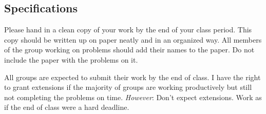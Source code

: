 \documentclass[11pt]{article}
\begin{document}
\subsection*{Specifications}

Please hand in a clean copy of your work by the end of your class period. This copy should be written up on paper neatly and in an organized way. All members of the group working on problems should add their names to the paper. Do not include the paper with the problems on it. 

All groups are expected to submit their work by the end of class. I have the right to grant extensions if the majority of groups are working productively but still not completing the problems on time. \emph{However}: Don't expect extensions. Work as if the end of class were a hard deadline. 
\end{document}
